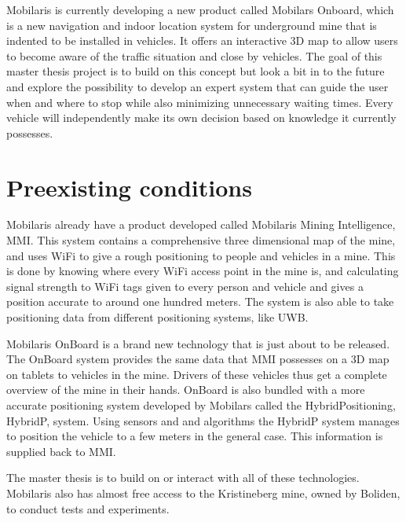 \documentclass{article}
\begin{document}
Mobilaris is currently developing a new product called Mobilars Onboard, which is a new navigation and indoor location system for underground mine that is indented to be installed in vehicles. It offers an interactive 3D map to allow users to become aware  of the traffic situation and close by vehicles. The goal of this master thesis project is to build on this concept but look a bit in to the future and explore the possibility to develop an expert system that can guide the user when and where to stop while also minimizing unnecessary waiting times. Every vehicle will independently make its own decision based on knowledge it currently possesses.

\section*{Preexisting conditions}
Mobilaris already have a product developed called Mobilaris Mining Intelligence, MMI. This system contains a comprehensive three dimensional map of the mine, and uses WiFi to give a rough positioning to people and vehicles in a mine. This is done by knowing where every WiFi access point in the mine is, and calculating signal strength to WiFi tags given to every person and vehicle and gives a position accurate to around one hundred meters. The system is also able to take positioning data from different positioning systems, like UWB.

Mobilaris OnBoard is a brand new technology that is just about to be released. The OnBoard system provides the same data that MMI possesses on a 3D map on tablets to vehicles in the mine. Drivers of these vehicles thus get a complete overview of the mine in their hands. OnBoard is also bundled with a more accurate positioning system developed by Mobilars called the HybridPositioning, HybridP, system. Using sensors and and algorithms the HybridP system manages to position the vehicle to a few meters in the general case. This information is supplied back to MMI.

The master thesis is to build on or interact with all of these technologies. Mobilaris also has almost free access to the Kristineberg mine, owned by Boliden, to conduct tests and experiments.
\end{document}
